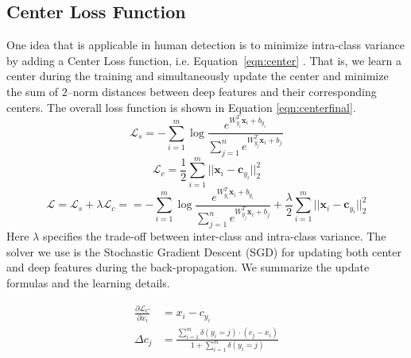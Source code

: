 \documentclass[a4paper]{article}
\begin{document}
\subsection{Center Loss Function}
One idea that is applicable in human detection is to minimize intra-class variance by adding a Center Loss function, i.e. Equation~\ref{eqn:center} \cite{Wen2016_facercnn}. That is, we learn a center during the training and simultaneously update the center and minimize the sum of $2$--norm distances between deep features and their corresponding centers. The overall loss function is shown in Equation \ref{eqn:centerfinal}.
\begin{equation}
\mathcal{L}_s = -\sum_{i=1}^m \log \frac{e^{W^T_{y_i}\mathbf{x}_i+b_{y_i}}}{\sum_{j=1}^n e^{W^T_{y_j}\mathbf{x}_i+b_{j}}}
\label{eqn:softmax}
\end{equation}
\begin{equation}
\mathcal{L}_c = \frac{1}{2}\sum_{i=1}^m ||\mathbf{x}_i-\mathbf{c}_{y_i}||_2^2
\label{eqn:center}
\end{equation}
\begin{equation}
\mathcal{L}=\mathcal{L}_s+\lambda \mathcal{L}_c==-\sum_{i=1}^m \log \frac{e^{W^T_{y_i}\mathbf{x}_i+b_{y_i}}}{\sum_{j=1}^n e^{W^T_{y_j}\mathbf{x}_i+b_{j}}}+\frac{\lambda}{2}\sum_{i=1}^m ||\mathbf{x}_i-\mathbf{c}_{y_i}||_2^2
\label{eqn:centerfinal}
\end{equation}
Here $\lambda$ specifies the trade-off between inter-class and intra-class variance.
The solver we use is the Stochastic Gradient Descent (SGD) for updating both center and deep features during the back-propagation. We summarize the update formulas and the learning details. 


\begin{align}\label{eqn:center_gradient}
\frac{\partial \mathcal{L}_C}{\partial x_i} &= x_i - c_{y_i}\\
\Delta c_j &= \frac{\sum_{i=1}^m \delta(y_i = j) \cdot (c_j - x_i)}{1 + \sum_{i=1}^m \delta(y_i = j)}
\end{align}
\end{document}

